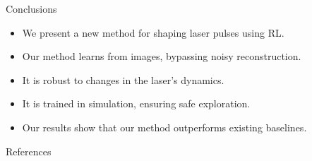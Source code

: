 \documentclass{beamer}
\begin{document}
\begin{frame}{Conclusions}
\begin{itemize}
    \item We present a new method for shaping laser pulses using RL.
    \item Our method learns from images, bypassing noisy reconstruction.
    \item It is robust to changes in the laser's dynamics.
    \item It is trained in simulation, ensuring safe exploration.
    \item Our results show that our method outperforms existing baselines.
\end{itemize}
\end{frame}
\begin{frame}[allowframebreaks]{References}
  \small
  
   
\end{frame}
\end{document}
